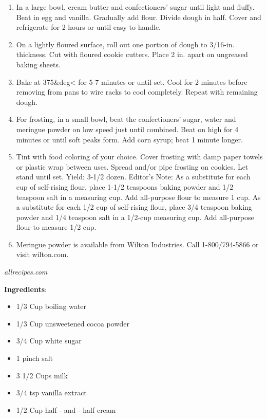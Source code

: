 \documentclass[11pt, twoside, openany]{book}
\begin{document}
\vspace{-3mm}\begin{enumerate}\setlength\itemsep{-1mm}
\item In a large bowl, cream butter and confectioners' sugar until light and fluffy. Beat in egg and vanilla. Gradually add flour. Divide dough in half. Cover and refrigerate for 2 hours or until easy to handle. 
\item  On a lightly floured surface, roll out one portion of dough to 3/16-in. thickness. Cut with floured cookie cutters. Place 2 in. apart on ungreased baking sheets. 
\item  Bake at 375&deg< for 5-7 minutes or until set. Cool for 2 minutes before removing from pans to wire racks to cool completely. Repeat with remaining dough. 
\item  For frosting, in a small bowl, beat the confectioners' sugar, water and meringue powder on low speed just until combined. Beat on high for 4 minutes or until soft peaks form. Add corn syrup; beat 1 minute longer. 
\item  Tint with food coloring of your choice. Cover frosting with damp paper towels or plastic wrap between uses. Spread and/or pipe frosting on cookies. Let stand until set. Yield: 3-1/2 dozen. Editor's Note: As a substitute for each cup of self-rising flour, place 1-1/2 teaspoons baking powder and 1/2 teaspoon salt in a measuring cup. Add all-purpose flour to measure 1 cup. As a substitute for each 1/2 cup of self-rising flour, place 3/4 teaspoon baking powder and 1/4 teaspoon salt in a 1/2-cup measuring cup. Add all-purpose flour to measure 1/2 cup. 
\item  Meringue powder is available from Wilton Industries. Call 1-800/794-5866 or visit wilton.com.
\end{enumerate}
 \label{creamy-hot-cocoa}\hfill\textit{allrecipes.com}\\
\begin{minipage}[t]{0.8\linewidth}
\textbf{Ingredients}:\vspace{-3mm}
\begin{multicols}{2}
\begin{itemize}\setlength\itemsep{-1mm}
\item 1/3 Cup boiling water
\item 1/3 Cup unsweetened cocoa powder
\item 3/4 Cup white sugar
\item 1 pinch salt
\item 3 1/2 Cups milk
\item 3/4 tsp vanilla extract
\item 1/2 Cup half - and - half cream
\end{itemize}
\end{multicols}
\end{minipage}
\end{document}
